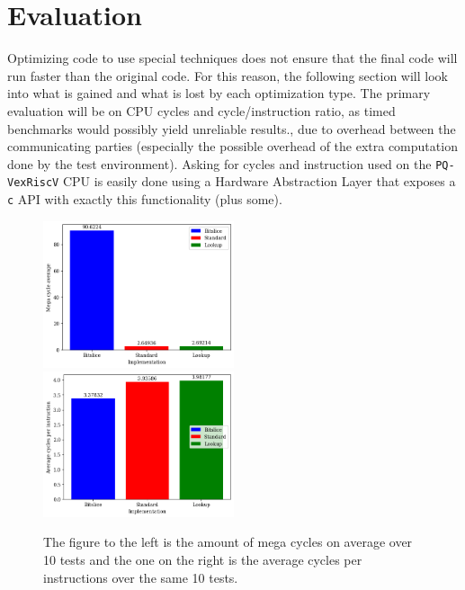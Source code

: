 \section{Evaluation} \label{evalsec}
Optimizing code to use special techniques does not ensure that the final code will run faster than the original code. For this reason, the following section will look into what is gained and what is lost by each optimization type. The primary evaluation will be on CPU cycles and cycle/instruction ratio, as timed benchmarks would possibly yield unreliable results., due to overhead between the communicating parties (especially the possible overhead of the extra computation done by the test environment). Asking for cycles and instruction used on the \texttt{PQ-VexRiscV} CPU is easily done using a Hardware Abstraction Layer that exposes a \texttt{c} API with exactly this functionality (plus some).
\begin{figure}[t]
    \includegraphics[width=0.5\textwidth]{resources/bar_avg_cycle.png}
    \includegraphics[width=0.5\textwidth]{resources/bar_avg_ratio.png}
    \caption{The figure to the left is the amount of mega cycles on average over 10 tests and the one on the right is the average cycles per instructions over the same 10 tests.}
    \label{eval:cycle}
\end{figure}
